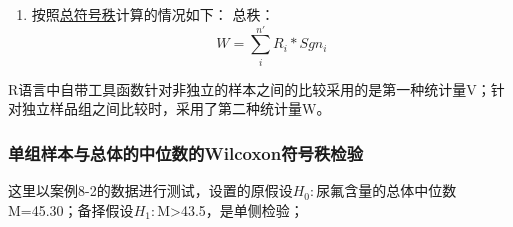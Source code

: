 \documentclass[
]{article}
\providecommand{\tightlist}{%
  \setlength{\itemsep}{0pt}\setlength{\parskip}{0pt}}
\begin{document}
\begin{enumerate}
\def\labelenumi{\arabic{enumi}.}
\setcounter{enumi}{1}
\tightlist
\item
  按照\href{https://en.wikipedia.org/wiki/Wilcoxon_signed-rank_test}{总符号秩}计算的情况如下：
  总秩：
  \[W=\sum_i^{n'}R_i*Sgn_i\]
\end{enumerate}

R语言中自带工具函数针对非独立的样本之间的比较采用的是第一种统计量V；针对独立样品组之间比较时，采用了第二种统计量W。

\hypertarget{ux5355ux7ec4ux6837ux672cux4e0eux603bux4f53ux7684ux4e2dux4f4dux6570ux7684wilcoxonux7b26ux53f7ux79e9ux68c0ux9a8c}{%
\subsubsection{单组样本与总体的中位数的Wilcoxon符号秩检验}\label{ux5355ux7ec4ux6837ux672cux4e0eux603bux4f53ux7684ux4e2dux4f4dux6570ux7684wilcoxonux7b26ux53f7ux79e9ux68c0ux9a8c}}

这里以案例8-2的数据进行测试，设置的原假设\(H_0:\)尿氟含量的总体中位数M=45.30；备择假设\(H_1:\)M\textgreater43.5，是单侧检验；
\end{document}
